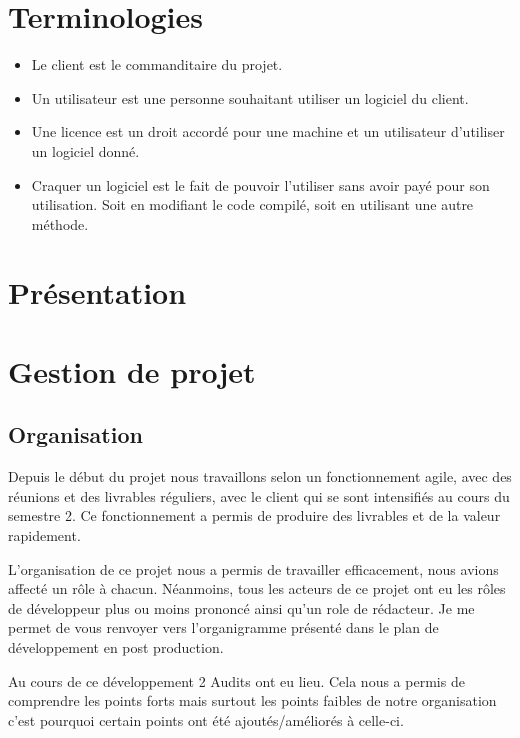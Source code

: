 \chapter{Terminologies}

\begin{itemize}
	\item Le client est le commanditaire du projet.
	\item Un utilisateur est une personne souhaitant utiliser un logiciel du client. 
	\item Une licence est un droit accordé pour une machine et un utilisateur d'utiliser un logiciel donné.
	\item Craquer un logiciel est le fait de pouvoir l'utiliser sans avoir payé pour son utilisation. 
	Soit en modifiant le code compilé, soit en utilisant une autre méthode. 
\end{itemize}

\chapter{Présentation}

\chapter{Gestion de projet}

\section{Organisation}

Depuis le début du projet nous travaillons selon un fonctionnement agile, avec des
réunions et des livrables réguliers, avec le client qui se sont intensifiés au cours du semestre 2. Ce fonctionnement a permis de produire des livrables et de
la valeur rapidement.\newline

L'organisation de ce projet nous a permis de travailler efficacement, nous avions affecté un rôle à
chacun. Néanmoins, tous les acteurs de ce projet ont eu les rôles de développeur plus ou moins prononcé ainsi qu'un role de
rédacteur. Je me permet de vous renvoyer vers l'organigramme présenté dans le plan de développement en post production.\newline

Au cours de ce développement 2 Audits ont eu lieu. Cela nous a permis de comprendre les points forts mais surtout les points faibles de notre
organisation c'est pourquoi certain points ont été ajoutés/améliorés à celle-ci. \newline

